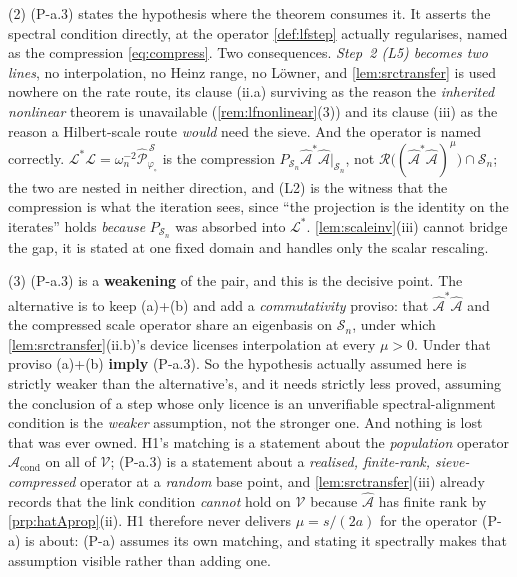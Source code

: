 \begin{remark}
(2) (P-a.3) states the hypothesis where the theorem consumes it. It asserts the spectral
condition directly, at the operator \cref{def:lfstep} actually regularises, named as the compression
\eqref{eq:compress}. Two consequences. \emph{Step~2 (L5) becomes two lines}, no interpolation, no Heinz
range, no L\"owner, and \cref{lem:srctransfer} is used nowhere on the rate route, its clause (ii.a)
surviving as the reason the \emph{inherited nonlinear} theorem is unavailable (\cref{rem:lfnonlinear}(3))
and its clause (iii) as the reason a Hilbert-scale route \emph{would} need the sieve. And the
operator is named correctly. $\mathcal L^{\ast}\mathcal L=\omega_n^{-2}\hat{\mathcal P}^{\,\mathcal S}_{\varphi_\circ}$
is the compression $P_{\mathcal S_n}\hat{\mathcal A}^{\ast}\hat{\mathcal A}\vert_{\mathcal S_n}$, not
$\mathcal R\big((\hat{\mathcal A}^{\ast}\hat{\mathcal A})^{\mu}\big)\cap\mathcal S_n$; the two are nested
in neither direction, and (L2) is the witness that the compression is what the iteration sees, since
``the projection is the identity on the iterates'' holds \emph{because} $P_{\mathcal S_n}$ was absorbed
into $\mathcal L^{\ast}$. \cref{lem:scaleinv}(iii) cannot bridge the gap, it is stated at one fixed
domain and handles only the scalar rescaling.

(3) (P-a.3) is a \textbf{weakening} of the pair, and this is the decisive point. The alternative
is
to keep (a)+(b) and add a \emph{commutativity} proviso: that $\hat{\mathcal A}^{\ast}\hat{\mathcal A}$
and the compressed scale operator share an eigenbasis on $\mathcal S_n$, under which
\cref{lem:srctransfer}(ii.b)'s device licenses interpolation at every $\mu>0$. Under that proviso
(a)+(b) \textbf{imply} (P-a.3). So the hypothesis actually assumed here is strictly weaker than the
alternative's, and it needs strictly less proved, assuming the conclusion of a step whose only licence
is an unverifiable spectral-alignment condition is the \emph{weaker} assumption, not the stronger one.
And nothing is lost that was ever owned. H1's matching is a statement about the \emph{population}
operator $\mathcal A_{\mathrm{cond}}$ on all of $\mathcal V$; (P-a.3) is a statement about a
\emph{realised, finite-rank, sieve-compressed} operator at a \emph{random} base point, and
\cref{lem:srctransfer}(iii) already records that the link condition \emph{cannot} hold on $\mathcal V$
because $\hat{\mathcal A}$ has finite rank by \cref{prp:hatAprop}(ii). H1 therefore never delivers
$\mu=s/(2a)$ for the operator (P-a) is about: (P-a) assumes its own matching, and stating it spectrally
makes that assumption visible rather than adding one.


\end{remark}
